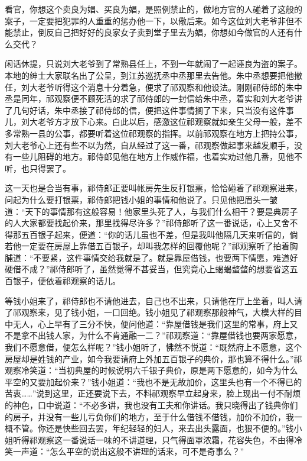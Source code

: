 \documentclass[12pt,UTF8]{ctexbook}
\begin{document}
{{{看官，你想这个卖良为娼、买良为娼，是照例禁止的，做地方官的人碰着了这般的案子，一定要把犯罪的人重重的惩办他一下，以儆后来。如今这位刘大老爷非但不能禁止，倒反自己把好好的良家女子卖到堂子里去为娼，你想如今做官的人还有什么交代？

闲话休提，只说刘大老爷到了常熟县任上，不到一年就闹了一起诬良为盗的案子。本地的绅士大家联名出了公呈，到江苏巡抚丞中丞那里去告他。朱中丞想要把他撤任，刘大老爷听得这个消息十分着急，便求了祁观察和他设法。刚刚祁侍郎的朱中丞是同年，祁观察便不顾死活的求了祁侍郎的一封信给朱中丞，着实和刘大老爷讲了几句好话，朱中丞接了祁侍郎的信，便把这件事情搁了下来，只当没有这件事儿，刘大老爷方才放下心来。白此以后，感激这位祁观察就如亲生父母一般，差不多常熟一县的公事，都要听着这位祁观察的指挥。以前祁观察在地方上把持公事，刘大老爷心上还有些不以为然，自从经过了这一番，祁观察做起事来越发顺手，没有一些儿阻碍的地方。祁侍郎见他在地方上作威作福，也着实劝过他几番，见他不听，也只得罢了。

这一天也是合当有事，祁侍郎正要叫帐房先生反打银票，恰恰碰着了祁观察进来，问起为什么要打银票，祁侍郎把钱小姐的事情和他说了。只见他把眉头一皱道：“天下的事情那有这般容易！他家里头死了人，与我们什么相干？要是典房子的人大家都要找起价来，那里找得尽许多？”祁侍郎听了这一番说话，心上又舍不得那五百银子起来，便道：“你的话儿虽也不差，但是我叫他隔几天来听信的，倘若他一定要在房屋上靠借五百银子，却叫我怎样的回覆他呢？”祁观察听了拍着胸脯道：“不要紧，这件事情交给我就是了。就是靠屋借钱，也要两下情愿，难道好硬借不成？”祁侍郎听了，虽然觉得不甚妥当，但究竟心上蝎蝎螫螫的想要省这五百银子，便依着祁观察的话儿。

等钱小姐来了，祁侍郎也不请他进去，自己也不出来，只请他在厅上坐着，叫人请了祁观察来，见了钱小姐，一口回绝。钱小姐见了祁观察那般神气，大模大样的目中无人，心上早有了三分不快，便问他道：“靠屋借钱是我们这里的常事，府上又不是拿不出钱人家，为什么不肯通融一二？”祁观察道：“靠屋借钱也要两家愿意，我们不愿意借，便怎么样呢？”钱小姐听了，怫然不悦道：“既然府上不愿意，这个房屋却是姓钱的产业，如今我要请府上外加五百银子的典价，那也算不得什么。”祁观察冷笑道：“当初典屋的时候说明六千银子典价，原是两下愿意的，如今为什么平空的又要加起价来？”钱小姐道：“我也不是无故加价，这里头也有一个不得已的苦衷……”说到这里，正还要说下去，不料祁观察早立起身来，脸上现出一付不耐烦的神色，口中说道：“不必多讲，我也没有工夫和你讲话。我只晓得出了钱典你们的房子，并没有一些儿亏负你们的地方，至于什么借钱不借钱，加价不加价，我一概不管。你还是快些回去罢，年纪轻轻的妇人，来去出头露面，也狠不便的。”钱小姐听得祁观察这一番说话一味的不讲道理，只气得面罩浓霜，花容失色，不由得冷笑一声道：“怎么平空的说出这般不讲理的话来，可不是奇事么？”

}}}
\end{document}
